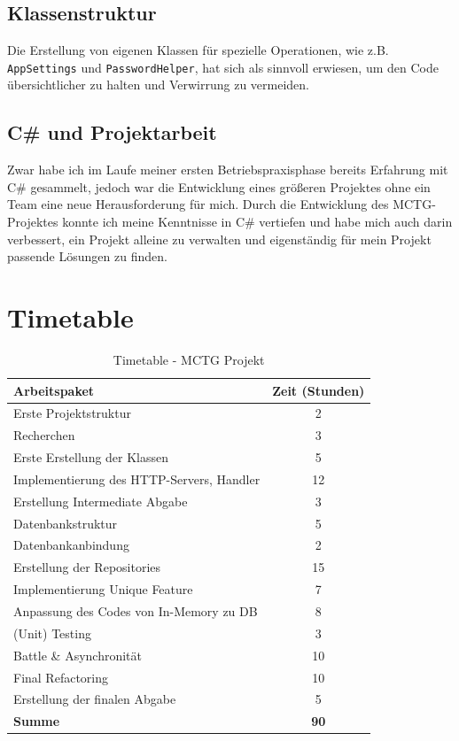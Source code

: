 \documentclass[a4paper, 12pt]{article}
\begin{document}
\subsection{Klassenstruktur}
Die Erstellung von eigenen Klassen für spezielle Operationen, wie z.B. \texttt{AppSettings} und \texttt{PasswordHelper}, hat sich als sinnvoll erwiesen, um den Code übersichtlicher zu halten und Verwirrung zu vermeiden.

\subsection{C\# und Projektarbeit}
Zwar habe ich im Laufe meiner ersten Betriebspraxisphase bereits Erfahrung mit C\# gesammelt, jedoch war die Entwicklung eines größeren Projektes ohne ein Team eine neue Herausforderung für mich.
Durch die Entwicklung des MCTG-Projektes konnte ich meine Kenntnisse in C\# vertiefen und habe mich auch darin verbessert, ein Projekt alleine zu verwalten und eigenständig für mein Projekt passende Lösungen zu finden.

\section{Timetable}
\begin{table}[h!]
\centering
\begin{tabular}{|l|c|}
\hline
\textbf{Arbeitspaket} & \textbf{Zeit (Stunden)} \\ \hline
Erste Projektstruktur & 2 \\ \hline
Recherchen & 3 \\ \hline
Erste Erstellung der Klassen & 5 \\ \hline
Implementierung des HTTP-Servers, Handler & 12 \\ \hline
Erstellung Intermediate Abgabe & 3 \\ \hline
Datenbankstruktur & 5 \\ \hline
Datenbankanbindung & 2 \\ \hline
Erstellung der Repositories & 15 \\ \hline
Implementierung Unique Feature & 7 \\ \hline
Anpassung des Codes von In-Memory zu DB & 8 \\ \hline
(Unit) Testing & 3 \\ \hline
Battle \& Asynchronität & 10 \\ \hline
Final Refactoring & 10 \\ \hline
Erstellung der finalen Abgabe & 5 \\ \hline
\textbf{Summe} & \textbf{90} \\ \hline
\end{tabular}
\caption{Timetable - MCTG Projekt}
\label{tab:timetable}
\end{table}
\end{document}
